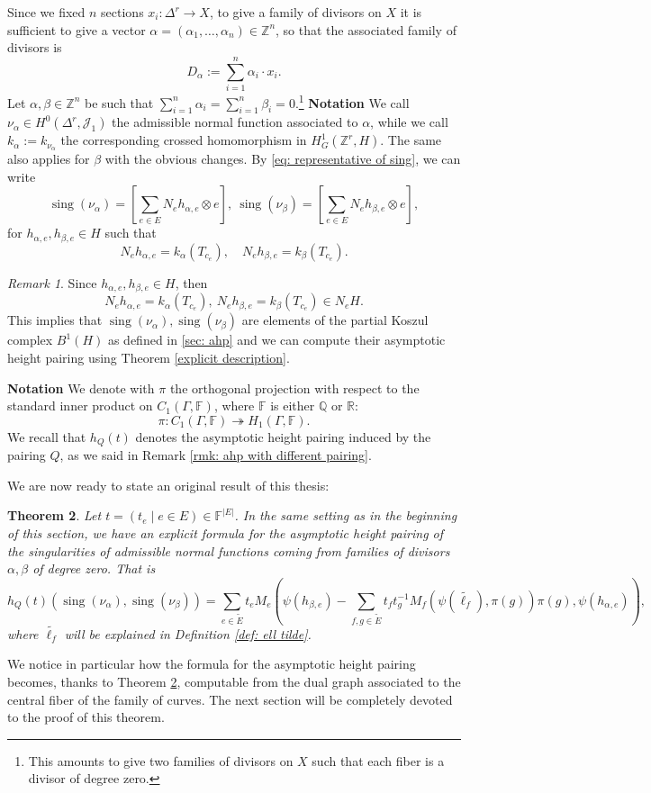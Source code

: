 \documentclass[a4paper,12 pt,titlepage,twoside]{book}
\newcommand{\numberset}{\mathbb}
\newcommand{\Z}{\numberset{Z}}
\newcommand{\R}{\numberset{R}}
\newcommand{\Q}{\numberset{Q}}
\newcommand{\F}{\numberset{F}}
\DeclareMathOperator{\sing}{sing}
\theoremstyle{plain}
\newtheorem{thm}{Theorem}[section]
\theoremstyle{theorem}
\theoremstyle{definition}
\theoremstyle{remark}
\newtheorem{oss}[thm]{Remark}
\begin{document}
	Since we fixed $n$ sections $x_i \colon \Delta^r \rightarrow X$, to give a family of divisors on $X$ it is sufficient to give a vector $\alpha =(\alpha_1, \dots, \alpha_n)\in \Z^n$, so that the associated family of divisors is $$D_\alpha := \sum_{i=1}^n \alpha_i \cdot x_i.$$ Let $\alpha, \beta \in \Z^n$ be such that $\sum_{i=1}^n \alpha_i = \sum_{i=1}^n \beta_i = 0.$\footnote{This amounts to give two families of divisors on $X$ such that each fiber is a divisor of degree zero.}\newline \newline
	\textbf{Notation} We call $\nu_\alpha\in H^0(\Delta^r, \mathcal{J}_1)$ the admissible normal function associated to $\alpha$, while we call $k_\alpha := k_{\nu_\alpha}$ the corresponding crossed homomorphism in $H^1_G(\Z^r, H).$ The same also applies for $\beta$ with the obvious changes. \newline \newline
	By \eqref{eq: representative of sing}, we can write $$\sing(\nu_\alpha) = [\sum_{e \in E} N_e h_{\alpha,e} \otimes e], \ \sing(\nu_\beta) = [\sum_{e \in E} N_e h_{\beta, e} \otimes e],$$ for $h_{\alpha,e}, h_{\beta,e} \in H$ such that $$N_eh_{\alpha,e} = k_\alpha(T_{c_e}), \quad N_eh_{\beta,e} = k_\beta(T_{c_e}).$$
	\begin{oss}
		Since $h_{\alpha,e}, h_{\beta,e} \in H$, then $$N_e h_{\alpha,e} = k_\alpha(T_{c_e}), \ N_e h_{\beta,e} = k_\beta(T_{c_e})  \in N_eH.$$ This implies that $\sing(\nu_\alpha), \sing(\nu_\beta)$ are elements of the partial Koszul complex $B^1(H)$ as defined in \ref{sec: ahp} and we can compute their asymptotic height pairing using Theorem \ref{explicit description}.
	\end{oss}
	\noindent \textbf{Notation} We denote with $\pi$ the orthogonal projection with respect to the standard inner product on $C_1(\Gamma,\F)$, where $\F$ is either $\Q$ or $\R$: $$\pi \colon C_1(\Gamma, \F) \twoheadrightarrow H_1(\Gamma, \F).$$ We recall that $h_Q(t)$ denotes the asymptotic height pairing induced by the pairing $Q$, as we said in Remark \ref{rmk: ahp with different pairing}.
	
	We are now ready to state an original result of this thesis:
	\begin{thm}\label{explicit formula}
		Let $t = (t_e\mid e \in E) \in \F^{|E|}$. In the same setting as in the beginning of this section, we have an explicit formula for the asymptotic height pairing of the singularities of admissible normal functions coming from families of divisors $\alpha, \beta$ of degree zero. That is $$h_Q(t)(\sing(\nu_\alpha), \sing(\nu_\beta)) = \sum_{e \in \tilde{E}} t_e M_e\left(\psi(h_{\beta,e}) - \sum_{f,g \in \tilde{E}} t_f t_g^{-1} M_f\left(\psi(\widetilde{\ell_f}), \pi(g)\right) \pi(g), \psi(h_{\alpha,e})\right),$$ where $\widetilde{\ell_f}$ will be explained in Definition \ref{def: ell tilde}.
	\end{thm}
	We notice in particular how the formula for the asymptotic height pairing becomes, thanks to Theorem \ref{explicit formula}, computable from the dual graph associated to the central fiber of the family of curves. The next section will be completely devoted to the proof of this theorem.
\end{document}
